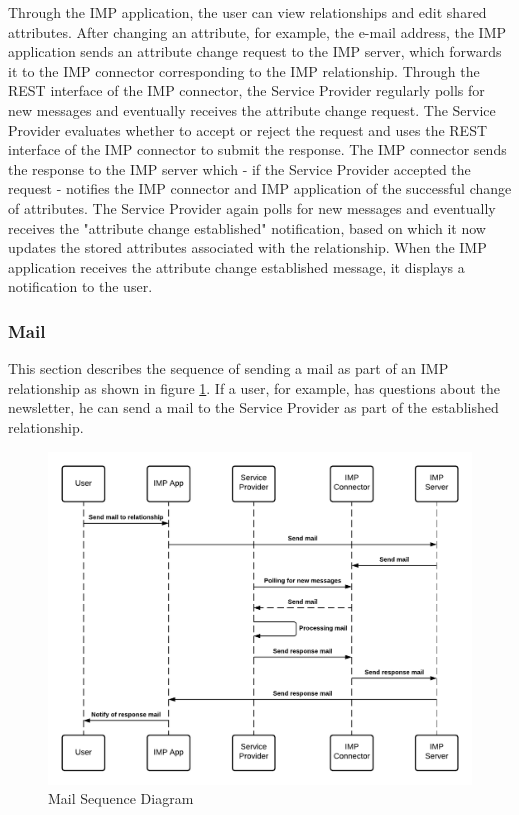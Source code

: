 Through the IMP application, the user can view relationships and edit shared attributes. After changing an attribute, for example, the e-mail address, the IMP application sends an attribute change request to the IMP server, which forwards it to the IMP connector corresponding to the IMP relationship. Through the REST interface of the IMP connector, the Service Provider regularly polls for new messages and eventually receives the attribute change request. The Service Provider evaluates whether to accept or reject the request and uses the REST interface of the IMP connector to submit the response. The IMP connector sends the response to the IMP server which - if the Service Provider accepted the request - notifies the IMP connector and IMP application of the successful change of attributes. The Service Provider again polls for new messages and eventually receives the "attribute change established" notification, based on which it now updates the stored attributes associated with the relationship. When the IMP application receives the attribute change established message, it displays a notification to the user.

\subsubsection{Mail}
This section describes the sequence of sending a mail as part of an IMP relationship as shown in figure \ref{imp:mail}.
If a user, for example, has questions about the newsletter, he can send a mail to the Service Provider as part of the established relationship.

\begin{figure}[h]
    \centering
    \includegraphics[scale=0.6]{Diagrams/IMP Use Case Mail Sequence Diagram.pdf}
    \caption{Mail Sequence Diagram}
    \label{imp:mail}
\end{figure}

